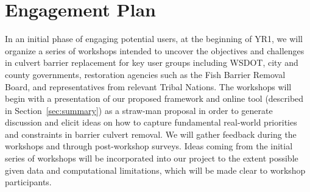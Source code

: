 \documentclass[12pt]{elsarticle}
\begin{document}

\section{Engagement Plan}\label{sec:engage} %

In an initial phase of engaging potential users, at the beginning of YR1, we will organize a series of workshops intended to uncover the objectives and challenges in culvert barrier replacement for key user groups including WSDOT, city and county governments, restoration agencies such as the Fish Barrier Removal Board, and representatives from relevant Tribal Nations. The workshops will begin with a presentation of our proposed framework and online tool (described in Section~\ref{sec:summary}) as a straw-man proposal in order to generate discussion and elicit ideas on how to capture fundamental real-world priorities and constraints in barrier culvert removal. We will gather feedback during the workshops and through post-workshop surveys. Ideas coming from the initial series of workshops will be incorporated into our project to the extent possible given data and computational limitations, which will be made clear to workshop participants.
\end{document}
